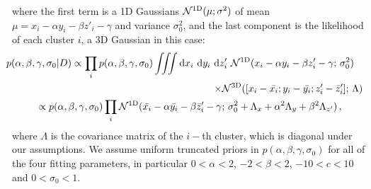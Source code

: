 {where the first term is a 1D Gaussians $\mathcal{N}^{\rm 1D}(\mu;\sigma^2)$ of mean $\mu=x_i-\alpha y_i-\beta z'_i-\gamma$ and variance $\sigma_0^2$, and the last component is the likelihood of each cluster $i$, a 3D Gaussian in this case:
\begin{multline}
\hspace{-20pt}p(\alpha,\beta,\gamma,\sigma_0|D)  \propto \prod_i p(\alpha,\beta,\gamma,\sigma_0) \iiint {\rm d} x_i ~{\rm d} y_i ~{\rm d} z'_i ~ \mathcal{N}^{\rm 1D}(x_i-\alpha y_i-\beta z'_i-\gamma;\,\sigma_0^{2})\\
\hspace{7cm} \times \mathcal{N}^{\rm 3D}( [x_i-\bar{x_i};y_i - \bar{y_i}; z'_i - \bar{z}'_i];\,\Lambda) \\
\propto p(\alpha,\beta,\gamma,\sigma_0)  \prod_i \mathcal{N}^{\rm 1D}(\bar{x_i}-\alpha\bar{y_i}-\beta\bar{z}'_i-\gamma;\,\sigma_0^{2}+\Lambda_x+\alpha^2\Lambda_{y}+\beta^2\Lambda_{z'})\,, \label{eq:posterior}
\end{multline}
where $\Lambda$ is the covariance matrix of the $i-$th cluster, which is diagonal under our assumptions. We assume uniform truncated priors in $p(\alpha,\beta,\gamma,\sigma_0)$ for all of the four fitting parameters, in particular $0<\alpha<2$, $-2<\beta<2$, $-10<c<10$ and $0<\sigma_0<1$.

}

